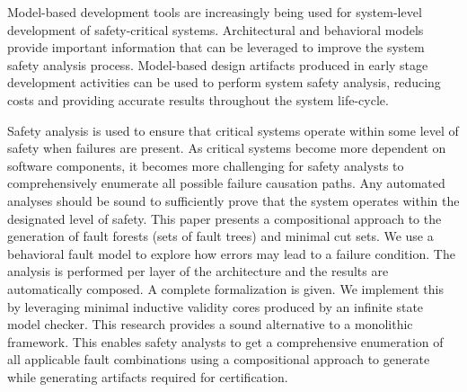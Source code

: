 Model-based development tools are increasingly being used for system-level development of safety-critical systems. Architectural and behavioral models  provide important information that can be leveraged to improve the system safety analysis process. Model-based design artifacts produced in early stage development activities can be used to perform system safety analysis, reducing costs and providing accurate results throughout the system life-cycle.

Safety analysis is used to ensure that critical systems operate within some level of safety when failures are present. As critical systems become more dependent on software components, it becomes more challenging for safety analysts to comprehensively enumerate all possible failure causation paths. Any automated analyses should be sound to sufficiently prove that the system operates within the designated level of safety. This paper presents a compositional approach to the generation of fault forests (sets of fault trees) and minimal cut sets. We use a behavioral fault model to explore how errors may lead to a failure condition. The analysis is performed per layer of the architecture and the results are automatically composed. A complete formalization is given. We implement this by leveraging minimal inductive validity cores produced by an infinite state model checker. This research provides a sound alternative to a monolithic framework. This enables safety analysts to get a comprehensive enumeration of all applicable fault combinations using a compositional approach to generate while generating artifacts required for certification.





